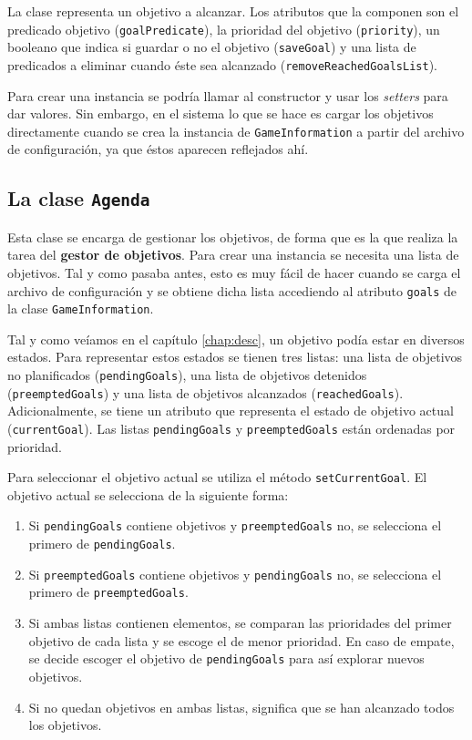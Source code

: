 La clase representa un objetivo a alcanzar. Los atributos que la componen son el predicado
objetivo (\texttt{goalPredicate}), la prioridad del objetivo (\texttt{priority}), un booleano
que indica si guardar o no el objetivo (\texttt{saveGoal}) y una lista de predicados a eliminar
cuando éste sea alcanzado (\texttt{removeReachedGoalsList}).

Para crear una instancia se podría llamar al constructor y usar los \textit{setters} para dar valores.
Sin embargo, en el sistema lo que se hace es cargar los objetivos directamente cuando se crea la
instancia de \texttt{GameInformation} a partir del archivo de configuración, ya que éstos aparecen reflejados
ahí.

\subsection{La clase \texttt{Agenda}}

Esta clase se encarga de gestionar los objetivos, de forma que es la que realiza la tarea del
\textbf{gestor de objetivos}. Para crear una instancia se necesita una lista de objetivos. Tal
y como pasaba antes, esto es muy fácil de hacer cuando se carga el archivo de configuración y
se obtiene dicha lista accediendo al atributo \texttt{goals} de la clase \texttt{GameInformation}.

Tal y como veíamos en el capítulo \ref{chap:desc}, un objetivo podía estar en diversos estados.
Para representar estos estados se tienen tres listas: una lista de objetivos no planificados
(\texttt{pendingGoals}), una lista de objetivos detenidos (\texttt{preemptedGoals}) y una lista
de objetivos alcanzados (\texttt{reachedGoals}). Adicionalmente, se tiene un atributo que representa
el estado de objetivo actual (\texttt{currentGoal}). Las listas \texttt{pendingGoals} y
\texttt{preemptedGoals} están ordenadas por prioridad.

Para seleccionar el objetivo actual se utiliza el método \texttt{setCurrentGoal}. El objetivo actual
se selecciona de la siguiente forma:

\begin{enumerate}[label=\arabic*º]
    \item Si \texttt{pendingGoals} contiene objetivos y \texttt{preemptedGoals} no, se selecciona
    el primero de \texttt{pendingGoals}.
    \item Si \texttt{preemptedGoals} contiene objetivos y \texttt{pendingGoals} no, se selecciona
    el primero de \texttt{preemptedGoals}.
    \item Si ambas listas contienen elementos, se comparan las prioridades del primer objetivo
    de cada lista y se escoge el de menor prioridad. En caso de empate, se decide escoger el
    objetivo de \texttt{pendingGoals} para así explorar nuevos objetivos.
    \item Si no quedan objetivos en ambas listas, significa que se han alcanzado todos los objetivos.
\end{enumerate}

